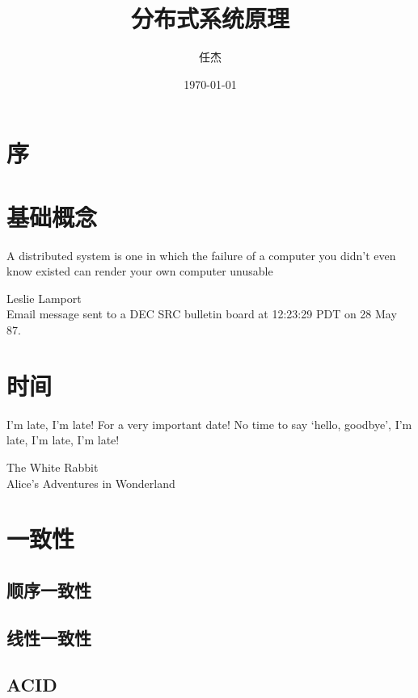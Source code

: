 \documentclass[reqno,heading=true,fontset=macnew]{ctexbook}
\begin{document}
\title{分布式系统原理}
\author{任杰}
\date{\today}

\maketitle
\tableofcontents


\chapter*{序}







\chapter{基础概念}

\epigraph{A distributed system is one in which the failure of a computer you didn't even know existed can render your own computer unusable}{Leslie Lamport \\ Email message sent to a DEC SRC bulletin board at 12:23:29 PDT on 28 May 87.}





\chapter{时间}

\epigraph{I’m late, I’m late! For a very important date! No time to say ‘hello, goodbye’, I’m late, I’m late, I’m late!}{The White Rabbit \\ Alice's Adventures in Wonderland}






\chapter{一致性}
\section{顺序一致性}

\section{线性一致性}
\section{ACID}
\end{document}
